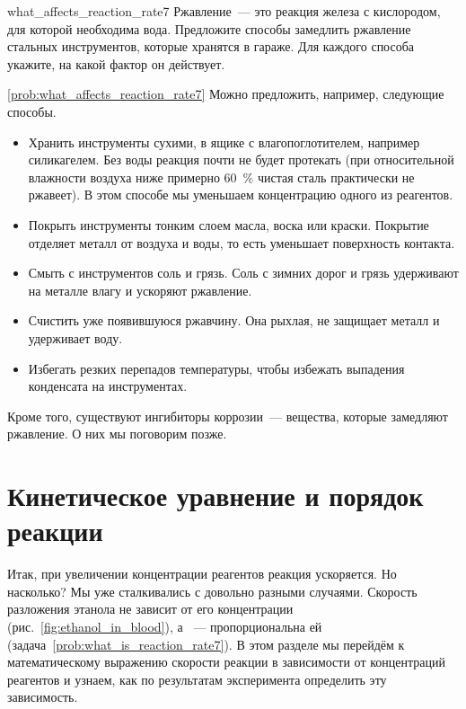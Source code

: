 \begin{problem}{}{what_affects_reaction_rate7}
    Ржавление~--- это реакция железа с кислородом, для которой необходима вода. Предложите способы замедлить ржавление стальных инструментов, которые хранятся в гараже. Для каждого способа укажите, на какой фактор он действует.
    \begin{sol}{\ref{prob:what_affects_reaction_rate7}}
        Можно предложить, например, следующие способы.
        \begin{itemize}
            \item Хранить инструменты сухими, в ящике с влагопоглотителем, например силикагелем. Без воды реакция почти не будет протекать (при относительной влажности воздуха ниже примерно \qty{60}{\percent} чистая сталь практически не ржавеет). В этом способе мы уменьшаем концентрацию одного из реагентов.
            \item Покрыть инструменты тонким слоем масла, воска или краски. Покрытие отделяет металл от воздуха и воды, то есть уменьшает поверхность контакта.
            \item Смыть с инструментов соль и грязь. Соль с зимних дорог и грязь удерживают на металле влагу и ускоряют ржавление.
            \item Счистить уже появившуюся ржавчину. Она рыхлая, не защищает металл и удерживает воду.
            \item Избегать резких перепадов температуры, чтобы избежать выпадения конденсата на инструментах.
        \end{itemize}
        Кроме того, существуют ингибиторы коррозии~--- вещества, которые замедляют ржавление. О них мы поговорим позже.
    \end{sol}
\end{problem}

\clearpage

\section{Кинетическое уравнение и порядок реакции}

Итак, при увеличении концентрации реагентов реакция ускоряется. Но насколько? Мы уже сталкивались с довольно разными случаями. Скорость разложения этанола не зависит от его концентрации (рис.~\ref{fig:ethanol_in_blood}), а ~--- пропорциональна ей (задача~\ref{prob:what_is_reaction_rate7}). В этом разделе мы перейдём к математическому выражению скорости реакции в зависимости от концентраций реагентов и узнаем, как по результатам эксперимента определить эту зависимость.

